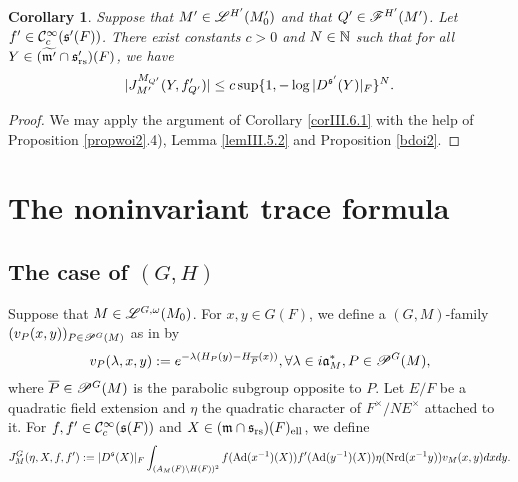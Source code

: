 \documentclass[a4paper]{amsart}
\newcommand{\fa}{{\mathfrak{a}}} \newcommand{\fb}{{\mathfrak{b}}}\newcommand{\fc}{{\mathfrak{c}}} \newcommand{\fd}{{\mathfrak{d}}}
\newcommand{\fm}{{\mathfrak{m}}} \newcommand{\fn}{{\mathfrak{n}}}\newcommand{\fo}{{\mathfrak{o}}} \newcommand{\fp}{{\mathfrak{p}}}
\newcommand{\ov}{\overline}
\newcommand{\wt}{\widetilde}                        \newcommand{\wh}{\widehat}                      \newcommand{\wpair}[1]{\left\{{#1}\right\}}
\newtheorem{coro}[thm]{Corollary}
\theoremstyle{definition}
\theoremstyle{remark}
\numberwithin{equation}{subsection}
\begin{document}
\begin{coro}\label{corIII.6.2}
Suppose that $M'\in\mathscr{L}^{H'}(M'_0)$ and that $Q'\in\mathscr{F}^{H'}(M')$. Let $f'\in{\mathcal {C}}_c^\infty({\mathfrak{s}}'(F))$. There exist constants $c>0$ and $N\in{\mathbb {N}}$ such that for all $Y\in(\wt{\fm'}\cap\fs'_\rs)(F)$, we have
$$ |J_{M'}^{M_{Q'}}(Y, f'_{Q'})| \leq c \sup\{1, -\log |D^{{\mathfrak{s}}'}(Y)|_F\}^N. $$
\end{coro}

\begin{proof}
We may apply the argument of Corollary \ref{corIII.6.1} with the help of Proposition \ref{propwoi2}.4), Lemma \ref{lemIII.5.2} and Proposition \ref{bdoi2}. 
\end{proof}




\section{\textbf{The noninvariant trace formula}}\label{secnontf}

\subsection{The case of $(G,H)$}

Suppose that $M\in\mathscr{L}^{G,\omega}(M_0)$. For $x,y\in G(F)$, we define a $(G,M)$-family $(v_P(x,y))_{P\in\mathscr{P}^G(M)}$ as in \cite[(12.1) in \S12]{MR1114210} by
$$ v_P(\lambda,x,y):=e^{-\lambda(H_P(y)-H_{\ov{P}}(x))}, \forall \lambda\in i\fa_M^\ast, P\in\msp^G(M), $$
where $\ov{P}\in\msp^G(M)$ is the parabolic subgroup opposite to $P$. Let $E/F$ be a quadratic field extension and $\eta$ the quadratic character of $F^\times/NE^\times$ attached to it. For $f, f'\in{\mathcal {C}}_c^\infty({\mathfrak{s}}(F))$ and $X\in(\fm\cap\fs_\rs)(F)_\el$, we define
\begin{equation}\label{defV.1.1}
 J_M^G(\eta, X, f, f'):=|D^{\mathfrak{s}}(X)|_F \int_{(A_M(F)\backslash H(F))^2} f({\mathrm{Ad}}(x^{-1})(X)) f'({\mathrm{Ad}}(y^{-1})(X)) \eta({\mathrm{Nrd}}(x^{-1}y)) v_M(x, y) dx dy. 
\end{equation}
\end{document}
